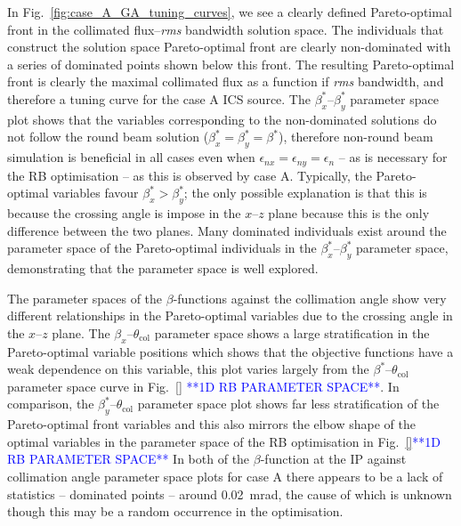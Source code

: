 \documentclass[../main.tex]{subfiles}
\begin{document}
In Fig.~\ref{fig:case_A_GA_tuning_curves}, we see a clearly defined Pareto-optimal front in the collimated flux--\textit{rms} bandwidth solution space. The individuals that construct the solution space Pareto-optimal front are clearly non-dominated with a series of dominated points shown below this front. The resulting Pareto-optimal front is clearly the maximal collimated flux as a function if \textit{rms} bandwidth, and therefore a tuning curve for the case A ICS source. The $\beta_{x}^{*}$--$\beta_{y}^{*}$ parameter space plot shows that the variables corresponding to the non-dominated solutions do not follow the round beam solution ($\beta_{x}^{*}=\beta_{y}^{*}=\beta^{*}$), therefore non-round beam simulation is beneficial in all cases even when $\epsilon_{nx}=\epsilon_{ny}=\epsilon_{n}$ -- as is necessary for the RB optimisation -- as this is observed by case A. Typically, the Pareto-optimal variables favour $\beta_{x}^{*}>\beta_{y}^{*}$; the only possible explanation is that this is because the crossing angle is impose in the $x$--$z$ plane because this is the only difference between the two planes. Many dominated individuals exist around the parameter space of the Pareto-optimal individuals in the $\beta_{x}^{*}$--$\beta_{y}^{*}$ parameter space, demonstrating that the parameter space is well explored.

The parameter spaces  of the $\beta$-functions against the collimation angle show very different relationships in the Pareto-optimal variables due to the crossing angle in the $x$--$z$ plane. The $\beta_{x}$--$\theta_{\mathrm{col}}$ parameter space shows a large stratification in the Pareto-optimal variable positions which shows that the objective functions have a weak dependence on this variable, this plot varies largely from the $\beta^{*}$--$\theta_{\mathrm{col}}$ parameter space curve in Fig.~\ref{} \textcolor{blue}{**1D RB PARAMETER SPACE**}. In comparison, the $\beta_{y}^{*}$--$\theta_{\mathrm{col}}$ parameter space plot shows far less stratification of the Pareto-optimal front variables and this also mirrors the elbow shape of the optimal variables in the parameter space of the RB optimisation in Fig.~\ref{}\textcolor{blue}{**1D RB PARAMETER SPACE**}  In both of the $\beta$-function at the IP against collimation angle parameter space plots for case A there appears to be a lack of statistics -- dominated points -- around 0.02~\si{\milli\radian}, the cause of which is unknown though this may be a random occurrence in the optimisation.    
\end{document}
